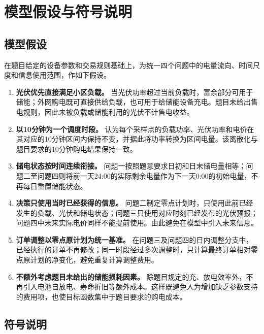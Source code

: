 \section{模型假设与符号说明}

\subsection{模型假设}

在题目给定的设备参数和交易规则基础上，为统一四个问题中的电量流向、时间尺度和信息使用范围，作如下假设。

\begin{enumerate}
    \item \textbf{光伏优先直接满足小区负载。}
    当光伏功率超过当前负载时，富余部分可用于储能；外网购电既可直接供给负载，也可用于给储能设备充电。题目未给出售电规则，因此未被负载或储能利用的光伏不计售电收益。

    \item \textbf{以10分钟为一个调度时段。}
    认为每个采样点的负载功率、光伏功率和电价在其对应的10分钟区间内保持不变，并据此将功率转换为区间电量。该离散化与题目要求的10分钟购电结果保持一致。

    \item \textbf{储电状态按时间连续衔接。}
    问题一按照题意要求日初和日末储电量相等；问题二至问题四则将前一天24:00的实际剩余电量作为下一天0:00的初始电量，不再每日重置储能状态。

    \item \textbf{决策只使用当时已经获得的信息。}
    问题二制定零点计划时，只使用此前已经发生的负载、光伏和储电状态；问题三只使用对应时刻已经发布的光伏预报；问题四中未来实际电价同样不能提前使用。由此避免在模型中引入未来信息。

    \item \textbf{订单调整以零点原计划为统一基准。}
    在问题三及问题四的日内调整分支中，已经执行的订单不再修改；同一时段经过多次调整时，只计算最终订单相对零点原计划的净变化，避免重复计算调整费用。

    \item \textbf{不额外考虑题目未给出的储能损耗因素。}
    除题目规定的充、放电效率外，不再引入电池自放电、寿命折旧等额外成本。这样既避免人为增加缺乏参数支持的费用项，也使目标函数集中于题目要求的购电成本。

\end{enumerate}


\subsection{符号说明}

